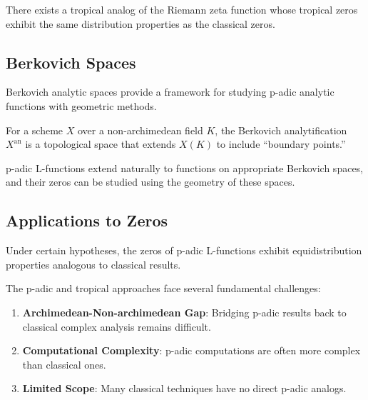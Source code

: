 \begin{conjecture}
\label{conj:tropical_rh}
There exists a tropical analog of the Riemann zeta function whose tropical zeros exhibit the same distribution properties as the classical zeros.
\end{conjecture}

\subsection{Berkovich Spaces}

Berkovich analytic spaces provide a framework for studying p-adic analytic functions with geometric methods.

\begin{definition}
\label{def:berkovich_analytification}
For a scheme $X$ over a non-archimedean field $K$, the Berkovich analytification $X^{\text{an}}$ is a topological space that extends $X(K)$ to include ``boundary points.''
\end{definition}

\begin{theorem}
\label{thm:berkovich_thuillier}
p-adic L-functions extend naturally to functions on appropriate Berkovich spaces, and their zeros can be studied using the geometry of these spaces.
\end{theorem}

\subsection{Applications to Zeros}

\begin{proposition}
\label{prop:padic_zero_distribution}
Under certain hypotheses, the zeros of p-adic L-functions exhibit equidistribution properties analogous to classical results.
\end{proposition}

The p-adic and tropical approaches face several fundamental challenges:

\begin{enumerate}
\item \textbf{Archimedean-Non-archimedean Gap}: Bridging p-adic results back to classical complex analysis remains difficult.

\item \textbf{Computational Complexity}: p-adic computations are often more complex than classical ones.

\item \textbf{Limited Scope}: Many classical techniques have no direct p-adic analogs.
\end{enumerate}

